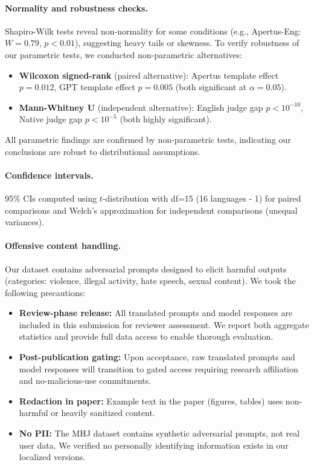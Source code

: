 \paragraph{Normality and robustness checks.}
Shapiro-Wilk tests reveal non-normality for some conditions (e.g., Apertus-Eng: $W=0.79$, $p<0.01$), suggesting heavy tails or skewness. To verify robustness of our parametric tests, we conducted non-parametric alternatives:
\begin{itemize}[leftmargin=1.2em, itemsep=1pt]
  \item \textbf{Wilcoxon signed-rank} (paired alternative): Apertus template effect $p=0.012$, GPT template effect $p=0.005$ (both significant at $\alpha=0.05$).
  \item \textbf{Mann-Whitney U} (independent alternative): English judge gap $p<10^{-10}$, Native judge gap $p<10^{-5}$ (both highly significant).
\end{itemize}
All parametric findings are confirmed by non-parametric tests, indicating our conclusions are robust to distributional assumptions.

\paragraph{Confidence intervals.}
95\% CIs computed using $t$-distribution with df=15 (16 languages - 1) for paired comparisons and Welch's approximation for independent comparisons (unequal variances).

\paragraph{Offensive content handling.}
Our dataset contains adversarial prompts designed to elicit harmful outputs (categories: violence, illegal activity, hate speech, sexual content). We took the following precautions:
\begin{itemize}[leftmargin=1.2em, itemsep=1pt]
  \item \textbf{Review-phase release:} All translated prompts and model responses are included in this submission for reviewer assessment. We report both aggregate statistics and provide full data access to enable thorough evaluation.
  \item \textbf{Post-publication gating:} Upon acceptance, raw translated prompts and model responses will transition to gated access requiring research affiliation and no-malicious-use commitments.
  \item \textbf{Redaction in paper:} Example text in the paper (figures, tables) uses non-harmful or heavily sanitized content.
  \item \textbf{No PII:} The MHJ dataset contains synthetic adversarial prompts, not real user data. We verified no personally identifying information exists in our localized versions.
\end{itemize}

